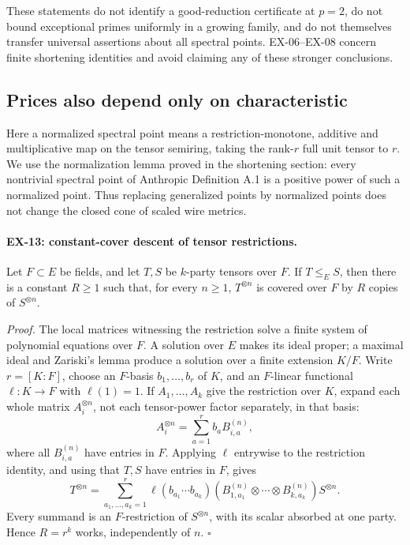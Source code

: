 These statements do not identify a good-reduction certificate at $p=2$, do not
bound exceptional primes uniformly in a growing family, and do not themselves
transfer universal assertions about all spectral points.  EX-06--EX-08 concern
finite shortening identities and avoid claiming any of these stronger
conclusions.

\subsection{Prices also depend only on characteristic}
\label{sec:ex-price-field}

Here a normalized spectral point means a restriction-monotone, additive and
multiplicative map on the tensor semiring, taking the rank-$r$ full unit tensor
to $r$.  We use the normalization lemma proved in the shortening section:
every nontrivial spectral point of Anthropic Definition A.1 is a positive
power of such a normalized point.  Thus replacing generalized points by
normalized points does not change the closed cone of scaled wire metrics.

\paragraph{EX-13: constant-cover descent of tensor restrictions.}
Let $F\subset E$ be fields, and let $T,S$ be $k$-party tensors over $F$.
If $T\leq_E S$, then there is a constant $R\geq1$ such that, for every
$n\geq1$, $T^{\otimes n}$ is covered over $F$ by $R$ copies of
$S^{\otimes n}$.

\emph{Proof.}
The local matrices witnessing the restriction solve a finite system of
polynomial equations over $F$.  A solution over $E$ makes its ideal proper;
a maximal ideal and Zariski's lemma produce a solution over a finite
extension $K/F$.  Write $r=[K:F]$, choose an $F$-basis $b_1,\ldots,b_r$ of $K$,
and an $F$-linear functional $\ell:K\to F$ with $\ell(1)=1$.
If $A_1,\ldots,A_k$ give the restriction over $K$, expand each whole matrix
$A_i^{\otimes n}$, not each tensor-power factor separately, in that basis:
\[
 A_i^{\otimes n}=\sum_{a=1}^r b_a B_{i,a}^{(n)},
\]
where all $B_{i,a}^{(n)}$ have entries in $F$.  Applying $\ell$ entrywise to
the restriction identity, and using that $T,S$ have entries in $F$, gives
\[
 T^{\otimes n}=\sum_{a_1,\ldots,a_k=1}^r
 \ell(b_{a_1}\cdots b_{a_k})
 (B_{1,a_1}^{(n)}\otimes\cdots\otimes B_{k,a_k}^{(n)})S^{\otimes n}.
\]
Every summand is an $F$-restriction of $S^{\otimes n}$, with its scalar
absorbed at one party.  Hence $R=r^k$ works, independently of $n$.
\hfill$\square$

